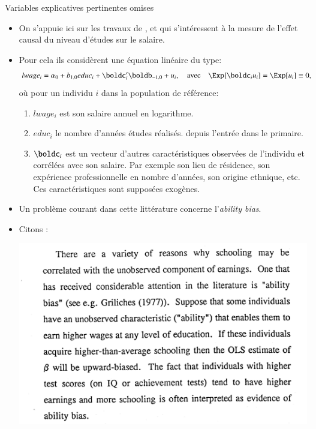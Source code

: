 \begin{frame}[allowframebreaks]{Variables explicatives pertinentes omises}
\begin{itemize}
\item On s'appuie ici sur les travaux de \cite{angrist1991}, et \cite{card1993} 
qui s'intéressent à la mesure de l'effet causal du niveau d'études sur le salaire. 
\item Pour cela ils considèrent une équation linéaire du type: 
\begin{align}
    lwage_i&= \alpha_0 + b_{1, 0}educ_i + \boldc_i^\prime\boldb_{-1, 0} + u_i, \quad 
    \text{avec} \quad \Exp[\boldc_iu_i] = \Exp[u_i]\equiv 0,
    \label{eq11}
\end{align}
où pour un individu $i$ dans la population de référence:
\begin{enumerate}[$\star$]
\item $lwage_i$ est son salaire annuel en logarithme.
\item $educ_i$ le nombre d'années études réalisés.
depuis l'entrée dans le primaire.
\item $\boldc_i$ est un vecteur 
d'autres caractéristiques observées de l'individu et corrélées avec son salaire. 
Par exemple son lieu de résidence, 
son expérience professionnelle en nombre d'années, son origine ethnique, etc. 
Ces caractéristiques sont supposées exogènes.
\end{enumerate}
\item Un problème courant dans cette littérature concerne l'\emph{ability bias}. 
\end{itemize}
\framebreak

\begin{itemize}
    \item Citons \cite{card1993}:
\begin{mdframed}

    \begin{center}
  \includegraphics[width=.6\textwidth]{cardNBER19931.png}
    \end{center}
    

\end{mdframed}
\end{itemize}
\end{frame}
